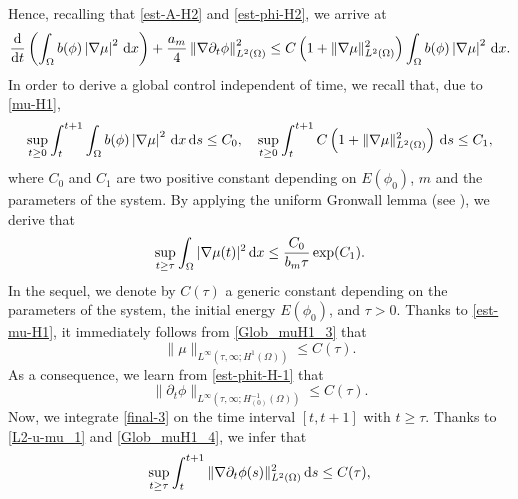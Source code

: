 \documentclass[11pt,reqno]{amsart}
\theoremstyle{remark}
\newcommand \norm[1] {\left\Vert #1\right\Vert}
\def\d{{\rm d}}
\def\ddt{\frac{\d}{\d t}}
\def\vphi{\varphi}
\numberwithin{equation}{section}
\def\d{{\rm d}}
\begin{document}
Hence, recalling that \eqref{est-A-H2} and \eqref{est-phi-H2}, we arrive at
\begin{align}
\label{final-3}
\ddt \left( \int_{\Omega} b(\phi) \left|\nabla \mu\right|^2 \, \d x\right)
 + \frac{a_m}{4}
 \norm{\nabla \partial_t \phi}_{L^2(\Omega)}^2
\leq C\left(1+  \| \nabla \mu\|_{L^2(\Omega)}^2
 \right)
  \int_{\Omega} b(\phi) \left|\nabla \mu\right|^2 \, \d x.
\end{align}
In order to derive a global control independent of time, we recall that, due to \eqref{mu-H1},
$$
\sup_{t \geq 0} \int_t^{t+1} \int_{\Omega} b(\phi) \left|\nabla \mu\right|^2 \, \d x \, \d s\leq C_0,\quad
\sup_{t \geq 0} \int_t^{t+1} C \left(1+ \| \nabla \mu\|_{L^2(\Omega)}^2
 \right) \, \d s \leq C_1,
$$
where $C_0$ and $C_1$ are two positive constant depending on $E(\phi_0)$, $m$ and the parameters of the system.
By applying the uniform Gronwall lemma (see \cite[Chapter III, Lemma
1.1]{TEMAM}),
we derive that
\begin{equation}
\label{Glob_muH1_3}
 \sup_{t \geq \tau} \int_{\Omega} |\nabla \mu(t)|^2 \, \d x
  \leq  \frac{C_0}{b_m \tau } \, {\rm exp} (C_1).
 \end{equation}
In the sequel, we denote by $C(\tau)$ a generic constant depending on the parameters of the system, the initial energy $E(\phi_0)$, and $\tau>0$.
Thanks to \eqref{est-mu-H1}, it immediately follows from \eqref{Glob_muH1_3} that
\begin{equation}
\label{Glob_muH1_4}
\| \mu\|_{L^\infty(\tau,\infty; H^1(\Omega))} \leq C(\tau).
\end{equation}
As a consequence, we learn from \eqref{est-phit-H-1} that
\begin{equation}
\label{phit-inf}
 \| \partial_t \phi \|_{L^\infty(\tau,\infty;  H^{-1}_{(0)}(\Omega))}\leq C(\tau).
\end{equation}
Now, we integrate \eqref{final-3} on the time interval $[t,t+1]$ with $t \geq \tau$. Thanks to \eqref{L2-u-mu_1} and \eqref{Glob_muH1_4}, we infer that
\begin{equation}
\label{phit-H1}
\sup_{t \geq \tau} \int_t^{t+1} \| \nabla \partial_t \phi (s)\|_{L^2(\Omega)}^2 \, \d s
\leq  C(\tau),
\end{equation}
\end{document}
